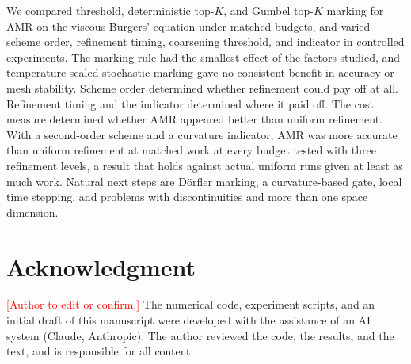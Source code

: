 \documentclass[conference]{IEEEtran}
\begin{document}
We compared threshold, deterministic top-$K$, and Gumbel top-$K$ marking for AMR on the viscous Burgers' equation under matched budgets, and varied scheme order, refinement timing, coarsening threshold, and indicator in controlled experiments. The marking rule had the smallest effect of the factors studied, and temperature-scaled stochastic marking gave no consistent benefit in accuracy or mesh stability. Scheme order determined whether refinement could pay off at all. Refinement timing and the indicator determined where it paid off. The cost measure determined whether AMR appeared better than uniform refinement. With a second-order scheme and a curvature indicator, AMR was more accurate than uniform refinement at matched work at every budget tested with three refinement levels, a result that holds against actual uniform runs given at least as much work. Natural next steps are D\"orfler marking, a curvature-based gate, local time stepping, and problems with discontinuities and more than one space dimension.

\section*{Acknowledgment}

\textcolor{red}{[Author to edit or confirm.]} The numerical code, experiment scripts, and an initial draft of this manuscript were developed with the assistance of an AI system (Claude, Anthropic). The author reviewed the code, the results, and the text, and is responsible for all content.
\end{document}
